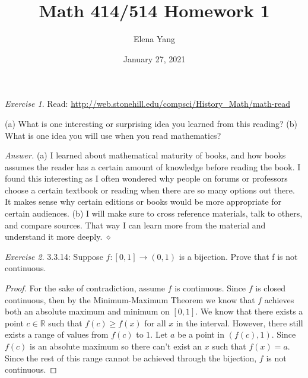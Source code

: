 \documentclass[12pt,oneside]{amsart}
\title{Math 414/514 Homework 1}
\author{Elena Yang}
\date{January 27, 2021}
\theoremstyle{definition}
\theoremstyle{remark}
\newtheorem{exer}{Exercise}
\numberwithin{equation}{exer}
\newenvironment{answer}{\bigskip\noindent\emph{Answer.}}{\hfill$\diamond$\newline}
\begin{document}
\maketitle

\begin{exer}
Read: \url{http://web.stonehill.edu/compsci/History_Math/math-read}

(a) What is one interesting or surprising idea you learned from this reading?
(b) What is one idea you will use when you read mathematics?
\end{exer}
\begin{answer}
(a) I learned about mathematical maturity of books, and how books assumes the reader has a certain amount of knowledge before reading the book. I found this interesting as I often wondered why people on forums or professors choose a certain textbook or reading when there are so many options out there. It makes sense why certain editions or books would be more appropriate for certain audiences. 
(b) I will make sure to cross reference materials, talk to others, and compare sources. That way I can learn more from the material and understand it more deeply.
\end{answer}

\newpage
\begin{exer}  
3.3.14: Suppose $f:[0,1]\rightarrow(0,1)$ is a bijection. Prove that f is not continuous.
\end{exer}
\begin{proof}
For the sake of contradiction, assume $f$ is continuous. Since $f$ is closed continuous, then by the Minimum-Maximum Theorem we know that $f$ achieves both an absolute maximum and minimum on $[0,1]$. We know that there exists a point $c \in \mathbb{R}$ such that $f(c)\geq f(x)$ for all $x$ in the interval. However, there still exists a range of values from $f(c)$ to $1$. Let $a$ be a point in $(f(c),1)$. Since $f(c)$ is an absolute maximum so there can't exist an $x$ such that $f(x)=a$. Since the rest of this range cannot be achieved through the bijection, $f$ is not continuous. 
\end{proof}
\end{document}
